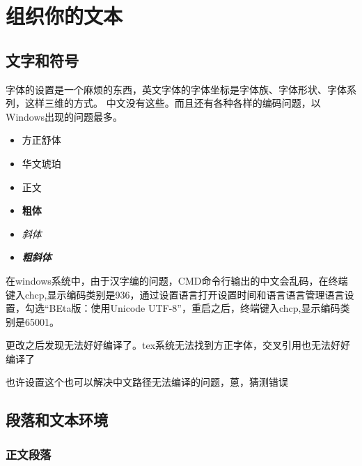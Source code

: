 \chapter{组织你的文本}

\section{文字和符号}
\label{sec:wenzi}
字体的设置是一个麻烦的东西，英文字体的字体坐标是字体族、字体形状、字体系列，这样三维的方式。
中文没有这些。而且还有各种各样的编码问题，以Windows出现的问题最多。


\begin{itemize}
\item { 方正舒体 \par }
\item { 华文琥珀 \par }
\item { 正文 \par }
\item {\bfseries 粗体 \par }
\item {\itshape 斜体 \par }
\item {\bfseries\itshape 粗斜体 \par }
\end{itemize}

在windows系统中，由于汉字编的问题，CMD命令行输出的中文会乱码，在终端键入chcp,显示编码类别是936，通过设置语言打开{设置}{时间和语言}{语言}{管理语言设置}，勾选``BEta版：使用Unicode UTF-8''，重启之后，终端键入chcp,显示编码类别是65001。

更改之后发现无法好好编译了。tex系统无法找到方正字体，交叉引用也无法好好编译了

也许设置这个也可以解决中文路径无法编译的问题，蒽，猜测错误
\section{段落和文本环境}
 \subsection{正文段落}
 
